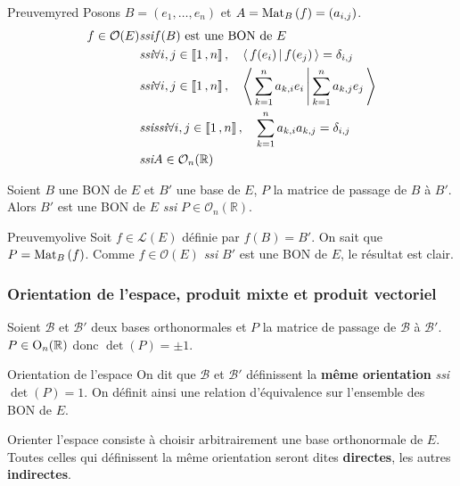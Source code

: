     \begin{demo}{Preuve}{myred}
        Posons $B = (e_1,\ldots,e_n)$ et $A = \text{Mat}_{B}\left(f\right) = (a_{i,j})$. 
        \begin{align*}
            f \in \mathcal{O}(E) 
            &\textit{ssi} f(B) \text{ est une BON de } E \\
            &\textit{ssi} \forall i,j \in \left\llbracket 1 \, , n \right\rrbracket, \quad \left<\,f(e_i)\,\middle|\,f(e_j)\,\right> = \delta_{i,j} \\
            &\textit{ssi} \forall i,j \in \left\llbracket 1 \, , n \right\rrbracket, \quad \left<\,\sum_{k=1}^n a_{k,i}e_i\,\middle|\,\sum_{k=1}^{n}a_{k,j}e_j\,\right> \\
            &\textit{ssi} \textit{ssi} \forall i,j \in \left\llbracket 1 \, , n \right\rrbracket, \quad \sum_{k=1}^{n} a_{k,i} a_{k,j} = \delta_{i,j} \\
            &\textit{ssi} A \in \mathcal{O}_n(\mathbb{R})
        \end{align*}
    \end{demo}

    \begin{prop}{}{}
        Soient $B$ une BON de $E$ et $B'$ une base de $E$, $P$ la matrice de passage de $B$ à $B'$. Alors $B'$ est une BON de $E$ \textit{ssi} $P \in \mathcal{O}_n(\mathbb{R})$.
    \end{prop}

    \begin{demo}{Preuve}{myolive}
        Soit $f \in \mathcal{L}(E)$ définie par $f(B) = B'$. On sait que $P = \text{Mat}_{B}\left(f\right)$. Comme $f \in \mathcal{O}(E)$ \textit{ssi} $B'$ est une BON de $E$, le résultat est clair.
    \end{demo}

    \subsubsection{Orientation de l’espace, produit mixte et produit vectoriel}

    Soient $\mathcal{B}$ et $\mathcal{B}'$ deux bases orthonormales et $P$ la matrice de passage de $\mathcal{B}$ à $\mathcal{B}'$. $P \in \operatorname{O}_n(\mathbb{R})$ donc $\det(P) = \pm 1$.

    \begin{defitheo}{Orientation de l’espace}{}
        On dit que $\mathcal{B}$ et $\mathcal{B}'$ définissent la \textbf{même orientation} \textit{ssi} $\det(P) = 1$. On définit ainsi une relation d’équivalence sur l’ensemble des BON de $E$.

        Orienter l’espace consiste à choisir arbitrairement une base orthonormale de $E$. Toutes celles qui définissent la même orientation seront dites \textbf{directes}, les autres \textbf{indirectes}.
    \end{defitheo}

